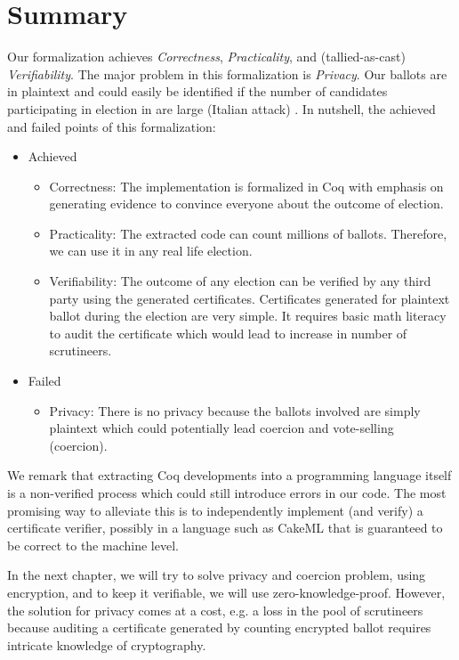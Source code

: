 \section{Summary}

Our formalization achieves \textit{Correctness}, \textit{Practicality}, and 
(tallied-as-cast) \textit{Verifiability}. The major problem in this formalization is \textit{Privacy}.  
Our ballots are in plaintext and could easily be identified
if the number of candidates participating in election in 
are large (Italian attack) \citep{Otten}.
\noindent
In nutshell, the achieved and failed points of this formalization:

\begin{itemize}
\item Achieved 
\begin{itemize}
\item Correctness: The implementation is formalized in Coq with emphasis on generating 
         evidence to convince everyone about the outcome of election.
\item Practicality: The extracted code can count millions of ballots. Therefore, we can use it 
          in any real life election.
\item Verifiability: The outcome of any election can be verified by any third party using 
		  the generated certificates. Certificates generated for plaintext ballot 
		  during the election 
          are very simple.  It requires basic math literacy to audit the certificate which would 
          lead to increase in number of scrutineers. 

\end{itemize}
\item Failed
\begin{itemize}
\item Privacy: There is no privacy  because the ballots involved 
         are simply plaintext which could potentially lead coercion and vote-selling (coercion).
\end{itemize}
\end{itemize}

We remark that extracting Coq developments into a
programming language itself is a non-verified process which could
still introduce errors in our code. The most promising way to
alleviate this is to independently implement (and verify) a
certificate verifier, possibly in a language such as CakeML
\citep{Kumar:2014:CVI} that is guaranteed to
be correct to the machine level. 

 In the next chapter, we will try to solve privacy and coercion problem, using encryption, and to keep 
 it verifiable, we will use zero-knowledge-proof. However, the solution for privacy comes at a cost, e.g. 
 a loss in the pool of scrutineers because auditing a certificate generated by counting encrypted ballot 
 requires intricate knowledge of cryptography.
 


